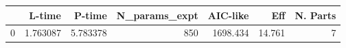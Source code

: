 \begin{tabular}{lrrrrrr}
\toprule
{} &    L-time &    P-time &  N\_params\_expt &  AIC-like &     Eff &  N. Parts \\
\midrule
0 &  1.763087 &  5.783378 &            850 &  1698.434 &  14.761 &         7 \\
\bottomrule
\end{tabular}
